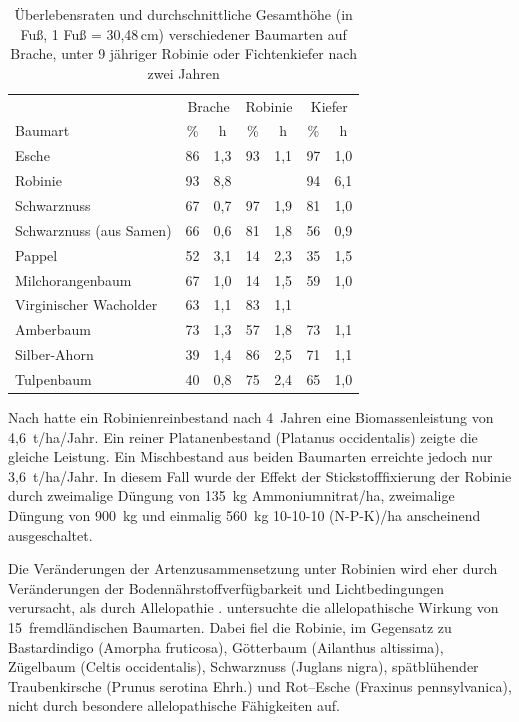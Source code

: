\documentclass[twocolumn]{scrartcl}
\begin{document}
\begin{table}[htbp]
\centering
\begin{tabular}{lcc|cc|cc}
   & \multicolumn{2}{c}{Brache} & \multicolumn{2}{c}{Robinie} & \multicolumn{2}{c}{Kiefer} \\
  Baumart & \% & h & \% & h & \% & h \\
  \hline
Esche                    & 86 & 1,3 & 93 & 1,1 & 97 & 1,0 \\
Robinie                  & 93 & 8,8 &  &  & 94 & 6,1 \\
Schwarznuss              & 67 & 0,7 & 97 & 1,9 & 81 & 1,0 \\
Schwarznuss (aus Samen)  & 66 & 0,6 & 81 & 1,8 & 56 & 0,9 \\
Pappel                   & 52 & 3,1 & 14 & 2,3 & 35 & 1,5 \\
Milchorangenbaum         & 67 & 1,0 & 14 & 1,5 & 59 & 1,0 \\
Virginischer Wacholder   & 63 & 1,1 & 83 & 1,1 &  &  \\
Amberbaum                & 73 & 1,3 & 57 & 1,8 & 73 & 1,1 \\
Silber-Ahorn             & 39 & 1,4 & 86 & 2,5 & 71 & 1,1 \\
Tulpenbaum               & 40 & 0,8 & 75 & 2,4 & 65 & 1,0 \\
\end{tabular}
\caption{Überlebensraten und durchschnittliche Gesamthöhe (in Fuß, 1 Fuß = 30,48\,cm) verschiedener Baumarten auf Brache, unter 9 jähriger Robinie oder Fichtenkiefer nach zwei Jahren \citep{limstrom1951schuttaufforstung}}
  \label{tab:zuwachsUnterbau3}
\end{table}

Nach \citet{dickmann1985robinieMischbestand} hatte ein
Robinienreinbestand nach 4~Jahren eine Biomassenleistung von
4,6~t/ha/Jahr. Ein reiner Platanenbestand (Platanus occidentalis)
zeigte die gleiche Leistung.  Ein Mischbestand aus beiden Baumarten
erreichte jedoch nur 3,6~t/ha/Jahr. In diesem Fall wurde der Effekt
der Stickstofffixierung der Robinie durch zweimalige Düngung von
135~kg Ammoniumnitrat/ha, zweimalige Düngung von 900~kg und einmalig
560~kg 10-10-10 (N-P-K)/ha anscheinend ausgeschaltet.

Die Veränderungen der Artenzusammensetzung unter Robinien wird eher
durch Veränderungen der Bodennährstoffverfügbarkeit und
Lichtbedingungen verursacht, als durch Allelopathie
\citep{vitkova2017robinie}.  \citet{csiszar2009allelopathy}
untersuchte die allelopathische Wirkung von 15~fremdländischen
Baumarten. Dabei fiel die Robinie, im Gegensatz zu Bastardindigo
(Amorpha fruticosa), Götterbaum (Ailanthus altissima), Zügelbaum
(Celtis occidentalis), Schwarznuss (Juglans nigra), spätblühender
Traubenkirsche (Prunus serotina Ehrh.) und Rot--Esche (Fraxinus
pennsylvanica), nicht durch besondere allelopathische Fähigkeiten auf.
\end{document}
